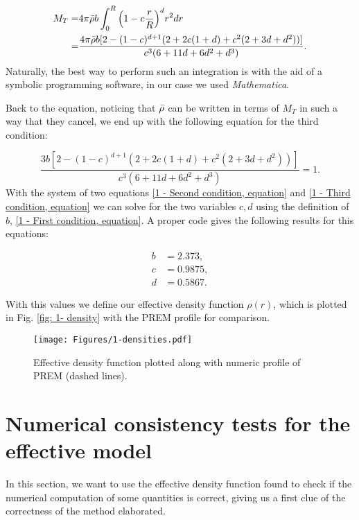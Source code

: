 \documentclass[aps,twocolumn,showpacs,preprintnumbers]{revtex4}
\begin{document}
    \begin{align*}
        M_T  =& 4 \pi \Bar{\rho} b \int_0^R \qty(1 - c \frac{r}{R} )^d r^2 dr \\
        =&  \frac{4 \pi \Bar{\rho} b[2 - (1-c)^{d+1} (2 + 2c (1+d) + c^2 (2 + 3d + d^2))]}{c^3 (6 + 11d + 6 d^2 + d^3)}.
    \end{align*}
    Naturally, the best way to perform such an integration is with the aid of a symbolic programming software, in our case we used \textit{Mathematica}.
    
    Back to the equation, noticing that $\Bar{\rho}$ can be written in terms of $M_T$ in such a way that they cancel, we end up with the following equation for the third condition:
    
    \begin{equation}
         \frac{ 3 b[2 - (1-c)^{d+1} (2 + 2c (1+d) + c^2 (2 + 3d + d^2))]}{c^3 (6 + 11d + 6 d^2 + d^3)} = 1.
         \label{1 - Third condition, equation}
    \end{equation}
    With the system of two equations \eqref{1 - Second condition, equation} and \eqref{1 - Third condition, equation} we can solve for the two variables $c, d$ using the definition of $b$, \eqref{1 - First condition, equation}. A proper code gives the following results for this equations:
    
    \begin{align*}
        b &= 2.373, \\
        c &= 0.9875, \\
        d &= 0.5867.
    \end{align*}
    
    With this values we define our effective density function $\rho (r)$, which is plotted in Fig. \eqref{fig: 1- density} with the PREM profile for comparison.
    
    \begin{figure}
        \centering
        \texttt{[image: Figures/1-densities.pdf]}
        \caption{Effective density function plotted along with numeric profile of PREM (dashed lines).}
        \label{fig: 1- density}
    \end{figure}
    
\section{Numerical consistency tests for the effective model} \label{consistency checks section}
    
In this section, we want to use the effective density function found to check if the numerical computation of some quantities is correct, giving us a first clue of the correctness of the method elaborated. 
    
\end{document}
